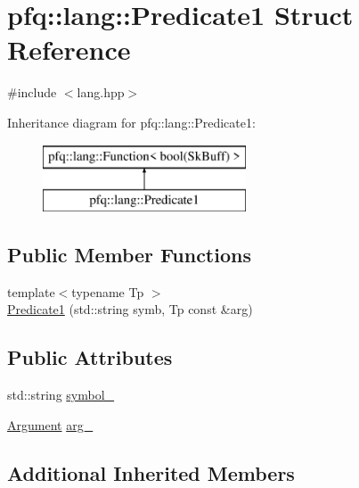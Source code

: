 \hypertarget{structpfq_1_1lang_1_1Predicate1}{\section{pfq\+:\+:lang\+:\+:Predicate1 Struct Reference}
\label{structpfq_1_1lang_1_1Predicate1}
}


{\ttfamily \#include $<$lang.\+hpp$>$}

Inheritance diagram for pfq\+:\+:lang\+:\+:Predicate1\+:\begin{figure}[H]
\begin{center}
\leavevmode
\includegraphics[height=2.000000cm]{structpfq_1_1lang_1_1Predicate1}
\end{center}
\end{figure}
\subsection*{Public Member Functions}
\begin{DoxyCompactItemize}
\item 
{\footnotesize template$<$typename Tp $>$ }\\\hyperlink{structpfq_1_1lang_1_1Predicate1_a8758dd31c809091dc67e22b5c8769e2d}{Predicate1} (std\+::string symb, Tp const \&arg)
\end{DoxyCompactItemize}
\subsection*{Public Attributes}
\begin{DoxyCompactItemize}
\item 
std\+::string \hyperlink{structpfq_1_1lang_1_1Predicate1_a28b92533bb4f026c391c123db3f285a6}{symbol\+\_\+}
\item 
\hyperlink{structpfq_1_1lang_1_1Argument}{Argument} \hyperlink{structpfq_1_1lang_1_1Predicate1_a2ed3f252ef326ba44788b36ac9322715}{arg\+\_\+}
\end{DoxyCompactItemize}
\subsection*{Additional Inherited Members}


